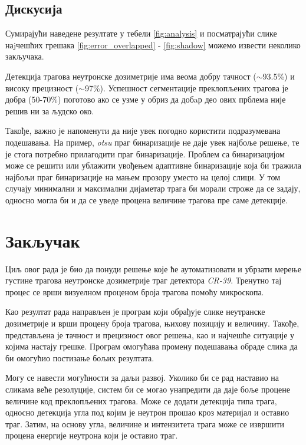 \documentclass[12pt,a4paper,serbian,oneside]{book}
\begin{document}
\section{Дискусија}

Сумирајући наведене резултате у тебели \ref{fig:analysis} и посматрајући слике наjчешћих грешака  \ref{fig:error_overlapped} - \ref{fig:shadow} можемо извести неколико закључака.

Детекција трагова неутронске дозиметрије има веома добру тачност ($\sim$93.5\%) и  високу прецизност ($\sim$97\%). Успешност сегментације преклопљених трагова је добра (50-70\%) поготово ако се узме у обриз да добaр део ових прблема није решив ни за људско око.

Такође, важно је напоменути да није увек погодно користити подразумевана подешавања. На пример, \textit{otsu} праг бинаризације не даје увек најбоље решење, те је стога потребно прилагодити праг бинаризације. Проблем са бинаризацијом може се решити или ублажити увођењем адаптивне бинаризације која би тражила најбољи праг бинаризације на мањем прозору уместо на целој слици. У том случају минимални и максимални дијаметар трага би морали строже да се задају, односно могла би и да се уведе процена величине трагова пре саме детекције.

%
%
%

\chapter{Закључак}

Циљ овог рада је био да понуди решење које ће аутоматизовати и убрзати мерење густине трагова неутронске дозиметрије траг детектора \textit{CR-39}. Тренутно тај процес се врши визуелном проценом броја трагова помоћу микроскопа.

Као резултат рада направљен је програм који обрађује слике неутранске дозиметрије и врши процену броја трагова, њихову позицију и величину. Такође, представљена је тачност и прецизност овог решења, као и најчешће ситуације у којима настају грешке. Програм омогућава промену подешавања обраде слика да би омогућио постизање бољих резултата.

Могу се навести могућности за даљи развој. Уколико би се рад наставио на сликама веће резолуције, систем би се могао унапредити да даје боље процене величине код преклопљених трагова. Може се додати детекција типа трага, односно детекција угла под којим је неутрон прошао кроз материјал и оставио траг. Затим, на основу угла, величине и интензитета трага може се извршити процена енергије неутрона који је оставио траг.  
\end{document}
